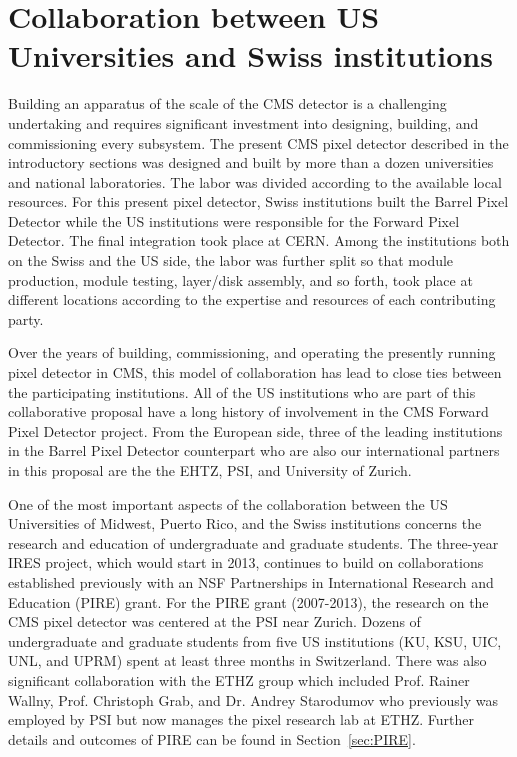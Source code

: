 
\section{Collaboration between US Universities and
Swiss institutions}
\label{sec:ties}


Building an apparatus of the scale of the CMS detector is a
challenging undertaking and requires significant investment into
designing, building, and commissioning every subsystem. The present
CMS pixel detector described in the introductory sections was designed
and built by more than a dozen universities and national laboratories.
The labor was divided according to the available local resources.  For
this present pixel detector, Swiss institutions built the Barrel Pixel
Detector while the US institutions were responsible for the Forward
Pixel Detector. The final integration took place at CERN. Among the
institutions both on the Swiss and the US side, the labor was further
split so that module production, module testing, layer/disk assembly,
and so forth, took place at different locations according to the
expertise and resources of each contributing party.

Over the years of building, commissioning, and operating the presently
running pixel detector in CMS, this model of collaboration has lead to
close ties between the participating institutions. All of the US
institutions who are part of this collaborative proposal have a long
history of involvement in the CMS Forward Pixel Detector project. From
the European side, three of the leading institutions in the Barrel Pixel
Detector counterpart who are also our international partners in this
proposal are the the EHTZ, PSI, and University of Zurich.

One of the most important aspects of the collaboration between the US
Universities of Midwest, Puerto Rico, and the Swiss institutions
concerns the research and education of undergraduate and graduate
students. The three-year IRES project, which would start in 2013,
continues to build on collaborations established previously with an
NSF Partnerships in International Research and Education (PIRE)
grant. For the PIRE grant (2007-2013), the research on the CMS pixel
detector was centered at the PSI near Zurich. Dozens of undergraduate
and graduate students from five US institutions (KU, KSU, UIC, UNL,
and UPRM) spent at least three months in Switzerland.  There was also
significant collaboration with the ETHZ group which included
Prof. Rainer Wallny, Prof. Christoph Grab, and Dr. Andrey Starodumov who
previously was employed by PSI but now manages the pixel research lab
at ETHZ. Further details and outcomes of PIRE can be found in 
Section~\ref{sec:PIRE}.

